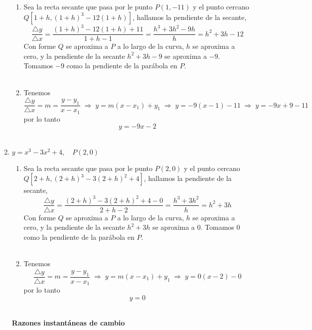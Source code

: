\begin{enumerate}
\begin{enumerate}[\bfseries a)]
    
    \item Sea la recta secante que pasa por le punto $P(1,-11)$  y el punto cercano $Q\left[1+h, (1+h)^3 -12(1+h)\right]$, hallamos la pendiente de la secante, $$\dfrac{\triangle y}{\triangle x} = \dfrac{(1+h)^3 - 12(1+h) + 11}{1+h - 1} = \dfrac{h^3 + 3h^2 - 9h}{h} = h^2+3h-12$$
    Con forme $Q$ se aproxima a $P$ a lo largo de la curva, $h$ se aproxima a cero, y la pendiente de la secante $h^2 + 3h - 9$ se aproxima a $-9$. Tomamos $-9$ como la pendiente de la parábola en $P$.\\\\

    \item Tenemos $$\dfrac{\triangle y}{\triangle x} = m = \dfrac{y - y_1}{x - x_1} \; \Longrightarrow \; y = m(x-x_1) + y_1\; \Longrightarrow \; y = -9(x-1) - 11 \; \Longrightarrow \; y = -9x + 9 - 11$$ por lo tanto $$y = -9x-2$$\\

\end{enumerate}

\item $y=x^3-3x^2+4,\quad P(2,0)$

\begin{enumerate}[\bfseries a)]
    
    \item Sea la recta secante que pasa por le punto $P(2,0)$  y el punto cercano $Q\left[2+h, (2+h)^3 -3(2+h)^2 + 4\right]$, hallamos la pendiente de la secante, $$\dfrac{\triangle y}{\triangle x} = \dfrac{(2+h)^3 - 3(2+h)^2 + 4 - 0}{2+h - 2} = \dfrac{h^3 + 3h^2}{h} = h^2+3h$$
    Con forme $Q$ se aproxima a $P$ a lo largo de la curva, $h$ se aproxima a cero, y la pendiente de la secante $h^2 + 3h$ se aproxima a $0$. Tomamos $0$ como la pendiente de la parábola en $P$.\\\\

    \item Tenemos $$\dfrac{\triangle y}{\triangle x} = m = \dfrac{y - y_1}{x - x_1} \; \Longrightarrow \; y = m(x-x_1) + y_1\; \Longrightarrow \; y = 0(x-2) - 0$$ por lo tanto $$y = 0$$\\

\end{enumerate}

\textbf{Razones instantáneas de cambio}\\\\


\end{enumerate}
